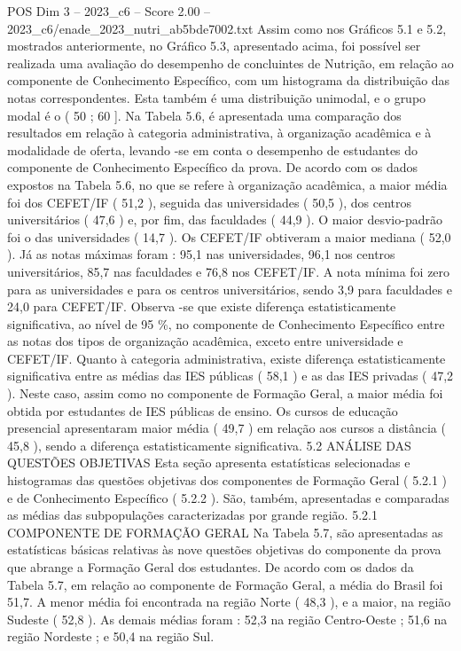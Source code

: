 \begin{textsample}{POS Dim 3 – 2023\_c6 – Score 2.00 – 2023\_c6/enade\_2023\_nutri\_ab5bde7002.txt}
Assim como nos Gráficos 5.1 e 5.2, mostrados anteriormente, no Gráfico 5.3, apresentado acima, foi possível ser realizada uma avaliação do desempenho de concluintes de Nutrição, em relação ao componente de Conhecimento Específico, com um histograma da distribuição das notas correspondentes.
Esta também é uma distribuição unimodal, e o grupo modal é o ( 50 ; 60 ].
Na Tabela 5.6, é apresentada uma comparação dos resultados em relação à categoria administrativa, à organização acadêmica e à modalidade de oferta, levando -se em conta o desempenho de estudantes do componente de Conhecimento Específico da prova.
De acordo com os dados expostos na Tabela 5.6, no que se refere à organização acadêmica, a maior média foi dos CEFET/IF ( 51,2 ), seguida das universidades ( 50,5 ), dos centros universitários ( 47,6 ) e, por fim, das faculdades ( 44,9 ).
O maior desvio-padrão foi o das universidades ( 14,7 ).
Os CEFET/IF obtiveram a maior mediana ( 52,0 ).
Já as notas máximas foram : 95,1 nas universidades, 96,1 nos centros universitários, 85,7 nas faculdades e 76,8 nos CEFET/IF.
A nota mínima foi zero para as universidades e para os centros universitários, sendo 3,9 para faculdades e 24,0 para CEFET/IF.
Observa -se que existe diferença estatisticamente significativa, ao nível de 95 \%, no componente de Conhecimento Específico entre as notas dos tipos de organização acadêmica, exceto entre universidade e CEFET/IF.
Quanto à categoria administrativa, existe diferença estatisticamente significativa entre as médias das IES públicas ( 58,1 ) e as das IES privadas ( 47,2 ).
Neste caso, assim como no componente de Formação Geral, a maior média foi obtida por estudantes de IES públicas de ensino.
Os cursos de educação presencial apresentaram maior média ( 49,7 ) em relação aos cursos a distância ( 45,8 ), sendo a diferença estatisticamente significativa. 5.2 ANÁLISE DAS QUESTÕES OBJETIVAS Esta seção apresenta estatísticas selecionadas e histogramas das questões objetivas dos componentes de Formação Geral ( 5.2.1 ) e de Conhecimento Específico ( 5.2.2 ).
São, também, apresentadas e comparadas as médias das subpopulações caracterizadas por grande região. 5.2.1 COMPONENTE DE FORMAÇÃO GERAL Na Tabela 5.7, são apresentadas as estatísticas básicas relativas às nove questões objetivas do componente da prova que abrange a Formação Geral dos estudantes.
De acordo com os dados da Tabela 5.7, em relação ao componente de Formação Geral, a média do Brasil foi 51,7.
A menor média foi encontrada na região Norte ( 48,3 ), e a maior, na região Sudeste ( 52,8 ).
As demais médias foram : 52,3 na região Centro-Oeste ; 51,6 na região Nordeste ; e 50,4 na região Sul.

\end{textsample}
